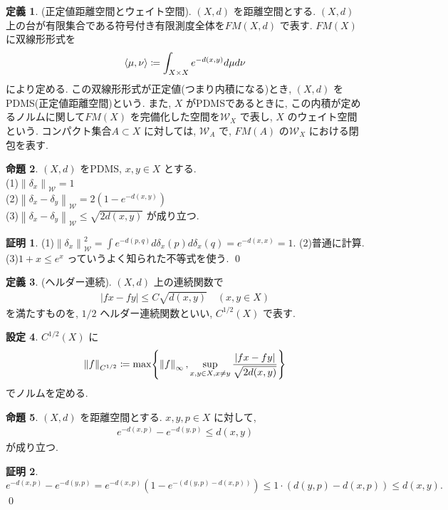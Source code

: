 \documentclass[10pt, fleqn, label-section=none]{bxjsarticle}
\theoremstyle{definition}
\newtheorem{dfn}{定義}[section]
\newtheorem{prop}[dfn]{命題}
\newtheorem{setting}[dfn]{設定}
\newtheorem*{pf*}{証明}
\newcommand{\cbra}[1]{\mleft\{#1\mright\}}
\newcommand{\tbra}[1]{\mleft\langle#1\mright\rangle}
\newcommand{\abs}[1]{\left|#1\right|}
\newcommand{\norm}[1]{\left\|#1\right\|}
\renewcommand{\;}{\, ; \,}
\begin{document}
\begin{dfn}(正定値距離空間とウェイト空間). $(X, d)$ を距離空間とする. $(X, d)$ 上の台が有限集合である符号付き有限測度全体を$FM(X, d)$ で表す. $FM(X)$ に双線形形式を
\begin{align*} \tbra{\mu, \nu} \coloneqq \int_{X \times X} e^{-d(x,y)} d\mu d\nu \end{align*}
により定める. この双線形形式が正定値(つまり内積になる)とき, $(X, d)$ をPDMS(正定値距離空間)という. 
また, $X$ がPDMSであるときに, この内積が定めるノルムに関して$FM(X)$ を完備化した空間を$\mathcal W_X$ で表し, $X$ のウェイト空間という. コンパクト集合$A \subset X$ に対しては, $\mathcal W _A $ で, $FM(A)$ の$\mathcal W_X$ における閉包を表す. 
\end{dfn}

\begin{prop}$(X, d)$ をPDMS, $x, y \in X$ とする.  \\
(1)$\norm{\delta_x}_{\mathcal W} = 1$ \\
(2)$\norm{\delta_x  - \delta_y}_{\mathcal W} = 2(1 - e^{-d(x, y)})$ \\
(3)$\norm{\delta_x  - \delta_y}_{\mathcal W} \leq \sqrt{2 d(x, y)}$
が成り立つ.
\end{prop}
\begin{pf*}
(1)$ \norm{\delta_x}_{\mathcal W}^2  = \int e^{-d(p,q)} d\delta_x(p) d \delta_x(q) = e^{-d(x,x)} = 1 $. (2)普通に計算. (3)$1+x \leq e^{x}$ っていうよく知られた不等式を使う. 
\qed
\end{pf*}


\begin{dfn}(ヘルダー連続). $(X, d)$ 上の連続関数で
\begin{align*} \abs{fx - fy} \leq C \sqrt{d(x, y)} \quad (x, y \in X) \end{align*}
を満たすものを, $1/2$ ヘルダー連続関数といい, $C^{1/2}(X)$ で表す. 
\end{dfn}

\begin{setting}$C^{1/2}(X)$ に
\begin{align*} \norm{f}_{C^{1/2}} \coloneqq \max \cbra{\norm{f}_\infty, \sup_{x, y \in X, x \neq y} \frac{\abs{fx - fy}}{\sqrt{2d(x, y)}} } \end{align*}
でノルムを定める. 
\end{setting}

\begin{prop}$(X, d)$ を距離空間とする. $x, y, p \in X$ に対して, 
\begin{align*} e^{-d(x, p)} - e^{-d(y, p)} \leq d(x, y)\end{align*}
が成り立つ. 
\end{prop}
\begin{pf*}
$e^{-d(x, p)} - e^{-d(y, p)} = e^{-d(x, p)}(1 - e^{-(d(y, p) - d(x, p) )   }) \leq 1 \cdot ( d(y, p) - d(x, p) )  \leq d(x, y) .$
\qed
\end{pf*}
\end{document}
